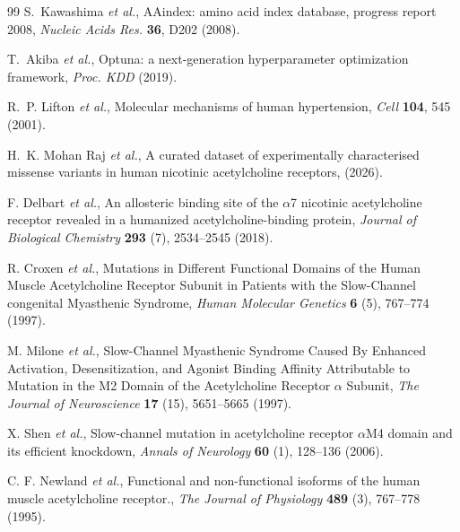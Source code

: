 \documentclass{ws-procs11x85}
\begin{document}
\begin{thebibliography}{99}
S.~Kawashima {\em et al.},
AAindex: amino acid index database, progress report 2008,
{\em Nucleic Acids Res.} {\bf 36}, D202 (2008).

T.~Akiba {\em et al.},
Optuna: a next-generation hyperparameter optimization framework,
{\em Proc. KDD} (2019).

R.~P. Lifton {\em et al.},
Molecular mechanisms of human hypertension,
{\em Cell} {\bf 104}, 545 (2001).

H.~K. Mohan Raj {\em et al.},
A curated dataset of experimentally characterised missense variants in
human nicotinic acetylcholine receptors, (2026).


F. Delbart {\em et al.}, An allosteric binding site of the $\alpha$7 nicotinic acetylcholine receptor revealed in a humanized acetylcholine-binding protein, {\em Journal of Biological Chemistry} {\bf 293} (7), 2534--2545 (2018).

R. Croxen {\em et al.}, Mutations in Different Functional Domains of the Human Muscle Acetylcholine Receptor   Subunit in Patients with the Slow-Channel congenital Myasthenic Syndrome, {\em Human Molecular Genetics} {\bf 6} (5), 767--774 (1997).

M. Milone {\em et al.}, Slow-Channel Myasthenic Syndrome Caused By Enhanced Activation, Desensitization, and Agonist Binding Affinity Attributable to Mutation in the M2 Domain of the Acetylcholine Receptor $\alpha$ Subunit, {\em The Journal of Neuroscience} {\bf 17} (15), 5651--5665 (1997).

X. Shen {\em et al.}, Slow-channel mutation in acetylcholine receptor $\alpha$M4 domain and its efficient knockdown, {\em Annals of Neurology} {\bf 60} (1), 128--136 (2006).

C. F. Newland {\em et al.}, Functional and non-functional isoforms of the human muscle acetylcholine receptor., {\em The Journal of Physiology} {\bf 489} (3), 767--778 (1995).


\end{thebibliography}
\end{document}
